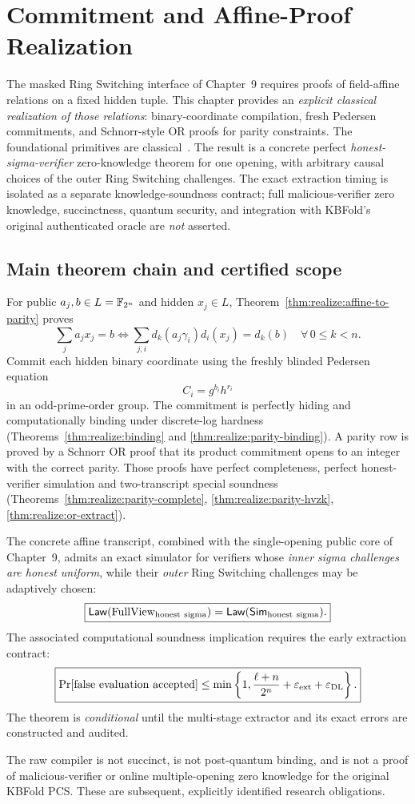 \section{Commitment and Affine-Proof Realization}\label{sec:realize}
The masked Ring Switching interface of Chapter~9 requires
proofs of field-affine relations on a fixed hidden tuple.
This chapter provides an \emph{explicit classical realization
of those relations}: binary-coordinate compilation,
fresh Pedersen commitments, and Schnorr-style OR proofs
for parity constraints. The foundational primitives
are classical~\cite{Pedersen1991,Schnorr1991,CramerDamgardSchoenmakers1994}.
The result is a concrete perfect \emph{honest-sigma-verifier}
zero-knowledge theorem for one opening, with arbitrary causal
choices of the outer Ring Switching challenges.
The exact extraction timing is isolated as a separate
knowledge-soundness contract; full malicious-verifier
zero knowledge, succinctness, quantum security, and
integration with KBFold's original authenticated oracle
are \emph{not} asserted.










\subsection{Main theorem chain and certified scope}\label{sec:realize:conclusion}
For public $a_j,b\in L=\mathbb{F}_{2^n}$ and hidden $x_j\in L$,
Theorem~\ref{thm:realize:affine-to-parity} proves
\[
 \boxed{\sum_ja_jx_j=b
 \iff
 \sum_{j,i}d_k(a_j\gamma_i)d_i(x_j)=d_k(b)
 \quad\forall\,0\le k<n.}
\]
Commit each hidden binary coordinate using the
freshly blinded Pedersen equation
\[
 C_i=g^{b_i}h^{r_i}
\]
in an odd-prime-order group. The commitment is
perfectly hiding and computationally binding
under discrete-log hardness
(Theorems~\ref{thm:realize:binding} and
\ref{thm:realize:parity-binding}).
A parity row is proved by a Schnorr OR proof
that its product commitment opens to an
integer with the correct parity.
Those proofs have perfect completeness,
perfect honest-verifier simulation and
two-transcript special soundness
(Theorems~\ref{thm:realize:parity-complete},
\ref{thm:realize:parity-hvzk},
\ref{thm:realize:or-extract}).

The concrete affine transcript, combined with
the single-opening public core of Chapter~9,
admits an exact simulator for verifiers whose
\emph{inner sigma challenges are honest uniform},
while their \emph{outer} Ring Switching challenges
may be adaptively chosen:
\[
 \boxed{
 \mathsf{Law}(\mathrm{FullView}_{\rm honest\ sigma})
 =\mathsf{Law}(\mathsf{Sim}_{\rm honest\ sigma}).}
\]
The associated computational soundness implication
requires the early extraction contract:
\[
 \boxed{
 \Pr[\mathrm{false\ evaluation\ accepted}]
 \leq \min\left\{1,
       \frac{\ell+n}{2^n}
       +\varepsilon_{\rm ext}
       +\varepsilon_{\rm DL}\right\}.}
\]
The theorem is \emph{conditional} until the
multi-stage extractor and its exact errors are
constructed and audited.

The raw compiler is not succinct, is not
post-quantum binding, and is not a proof of
malicious-verifier or online multiple-opening
zero knowledge for the original KBFold PCS.
These are subsequent, explicitly identified
research obligations.
